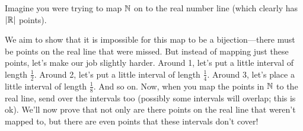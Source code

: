 \documentclass[11pt,twoside=off,numbers=noenddot]{scrbook}
\begin{document}
\begin{proofsketch}
  Imagine you were trying to map $\mathbb N$ on to the real number line
  (which clearly has $| \mathbb R |$ points).

  \begin{tightfigure}
    \centering
    \usetikzlibrary{arrows.meta}
  \end{tightfigure}

  We aim to show that it is impossible for this map to be a
  bijection---there must be points on the real line that were missed.
  But instead of mapping just these points, let's make our job
  slightly harder. Around 1, let's put a little interval of length
  $\frac{1}{2}$. Around 2, let's put a little interval of length
  $\frac{1}{4}$. Around 3, let's place a little interval of length
  $\frac{1}{8}$. And so on. Now, when you map the points in $\mathbb N$ to
  the real line, send over the intervals too (possibly some intervals
  will overlap; this is ok). We'll now prove that not only are there
  points on the real line that weren't mapped to, but there are even
  points that these intervals don't cover!


\end{proofsketch}
\end{document}
